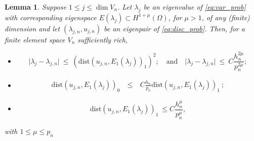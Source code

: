\documentclass[preprint,12pt]{elsarticle}
\newtheorem{lemma}[theorem]{Lemma}
\begin{document}
\begin{lemma}
\label{lm:adj}
Suppose  $ 1 \leq j\leq \dim V_n$. Let
$\lambda_j$ be an eigenvalue   of \eqref{eq:var_prob} with
corresponding eigenspace $E(\lambda_j)\subset H^{1+\mu}(\Omega)$, for $\mu>1$, of any (finite) dimension  and
let $(\lambda_{j,n},u_{j,n})$ be an  eigenpair  of \eqref{eq:disc_prob}.
Then, for a finite element space $V_n$ sufficiently rich,
\begin{itemize}
\item[(i)] 
\begin{equation}
\vert \lambda_j - \lambda_{j,n} \vert \ \leq \ (\mathrm{dist}(
u_{j,n},E_1(\lambda_j))_{1})^2; \quad \text{and} \quad
\vert \lambda_j - \lambda_{j,n} \vert \ \leq \ C
\frac{h_n^{2\mu} }{p_n^{2\mu}};  \label{eq:supereig}
\end{equation}
\item[(ii)] 
\begin{eqnarray}
\mathrm{dist}(
u_{j,n},E_1(\lambda_j))_{0}\ & \leq& \ C \frac{h_n}{p_n}
 \mathrm{dist}(
u_{j,n},E_1(\lambda_j))_{1} \ ; \label{eq:adj}
\end{eqnarray}
\item[(iii)]
\begin{equation}
\label{eq:energy} \mathrm{dist}(
u_{j,n},E_1(\lambda_j))_{1} \ \leq
C \frac{h_n^{\mu}}{p_n^{\mu}}, 
\end{equation}
\end{itemize}
with $1\leq \mu\leq p_n$
\end{lemma}
\end{document}
